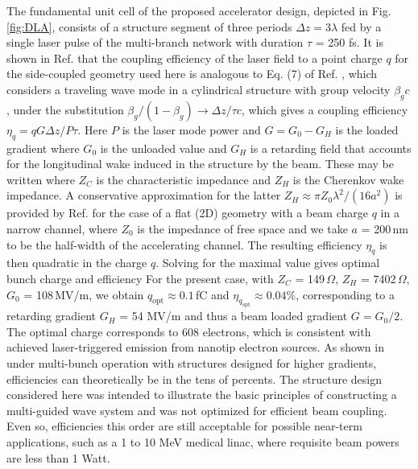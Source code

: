 The fundamental unit cell of the proposed accelerator design, depicted in Fig.
\ref{fig:DLA}, consists of a structure segment of three periods $\Delta z = 3 \lambda$ fed by a single laser pulse of the multi-branch network with duration $\tau$ = 250 fs.
 It is shown in Ref.
\cite{plettner2006proposed} that the coupling efficiency of the laser field to a point charge $q$ for the side-coupled geometry used here is analogous to Eq.
(7) of Ref.
\cite{Siemann:PRSTB04}, which considers a traveling wave mode in a cylindrical structure with group velocity $\beta_g c$, under the substitution $\beta_g / (1-\beta_g) \rightarrow \Delta z / \tau c$, which gives a coupling efficiency $\eta_q = q G \Delta z / P \tau$.
 Here $P$ is the laser mode power and $G = G_0 - G_H$ is the loaded gradient where $G_0$ is the unloaded value and $G_H$ is a retarding field that accounts for the longitudinal wake induced in the structure by the beam.
 These may be written
where $Z_C$ is the characteristic impedance and $Z_H$ is the Cherenkov wake impedance.
 A conservative approximation for the latter $Z_H \approx \pi Z_0 \lambda^2 / (16 a^2)$ is provided by Ref.
\cite{Bane:PRSTB2015} for the case of a flat (2D) geometry with a beam charge $q$ in a narrow channel, where $Z_0$ is the impedance of free space and we take $a$ = 200\,nm to be the half-width of the accelerating channel.
 The resulting efficiency $\eta_q$ is then quadratic in the charge $q$.
 Solving for the maximal value gives optimal bunch charge and efficiency
For the present case, with $Z_C$ = 149\,$\Omega$, $Z_H$ = 7402\,$\Omega$, $G_0$ = 108\,MV/m, we obtain $q_\text{opt} \approx 0.1$\,fC and $\eta_{q_\text{opt}} \approx 0.04 \%$, corresponding to a retarding gradient  $G_H$ = 54 MV/m and thus a beam loaded gradient $G = G_0/2$.
 The optimal charge corresponds to 608 electrons, which is consistent with achieved laser-triggered emission from nanotip electron sources.
 As shown in \cite{Siemann:PRSTB05} under multi-bunch operation with structures designed for higher gradients, efficiencies can theoretically be in the tens of percents.
 The structure design considered here was intended to illustrate the basic principles of constructing a multi-guided wave system and was not optimized for efficient beam coupling.
 Even so, efficiencies this order are still acceptable for possible near-term applications, such as a 1 to 10 MeV medical linac, where requisite beam powers are less than 1 Watt.
 

